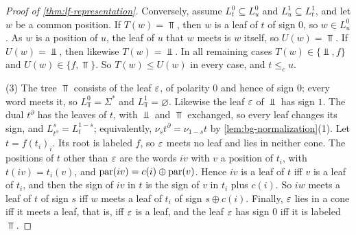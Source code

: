 \begin{proof}[Proof of \cref{thm:lf-representation}]
Conversely, assume $L^0_t\subseteq L^0_u$ and $L^1_u\subseteq L^1_t$, and let
$w$ be a common position. If $T(w)=\Top$, then $w$ is a leaf of $t$ of sign
$0$, so $w\in L^0_u$. As $w$ is a position of $u$, the leaf of $u$ that $w$
meets is $w$ itself, so $U(w)=\Top$. If $U(w)=\Bot$, then likewise
$T(w)=\Bot$. In all remaining cases $T(w)\in\{\Bot,f\}$ and
$U(w)\in\{f,\Top\}$. So $T(w)\le U(w)$ in every case, and $t\le_c u$.

(3) The tree $\Top$ consists of the leaf $\varepsilon$, of polarity $0$ and hence of
sign $0$; every word meets it, so $L^0_\Top=\Sigma^*$ and
$L^1_\Top=\varnothing$. Likewise the leaf $\varepsilon$ of $\Bot$ has sign $1$. The
dual $t^\partial$ has the leaves of $t$, with $\Bot$ and $\Top$ exchanged, so
every leaf changes its sign, and $L^s_{t^\partial}=L^{1-s}_t$; equivalently,
$\nu_st^\partial=\nu_{1-s}t$ by \cref{lem:bg-normalization}(1). Let
$t=f(t_i)_i$. Its root is labeled $f$, so $\varepsilon$ meets no leaf and lies in
neither cone. The positions of $t$ other than $\varepsilon$ are the words $iv$ with
$v$ a position of $t_i$, with $t(iv)=t_i(v)$, and
$\operatorname{par}(iv)=c(i)\oplus\operatorname{par}(v)$. Hence $iv$ is a leaf of $t$ iff $v$ is a
leaf of $t_i$, and then the sign of $iv$ in $t$ is the sign of $v$ in $t_i$
plus $c(i)$. So $iw$ meets a leaf of $t$ of sign $s$ iff $w$ meets a leaf of
$t_i$ of sign $s\oplus c(i)$. Finally, $\varepsilon$ lies in a cone iff it meets a
leaf, that is, iff $\varepsilon$ is a leaf, and the leaf $\varepsilon$ has sign $0$ iff it
is labeled $\Top$.
\end{proof}

